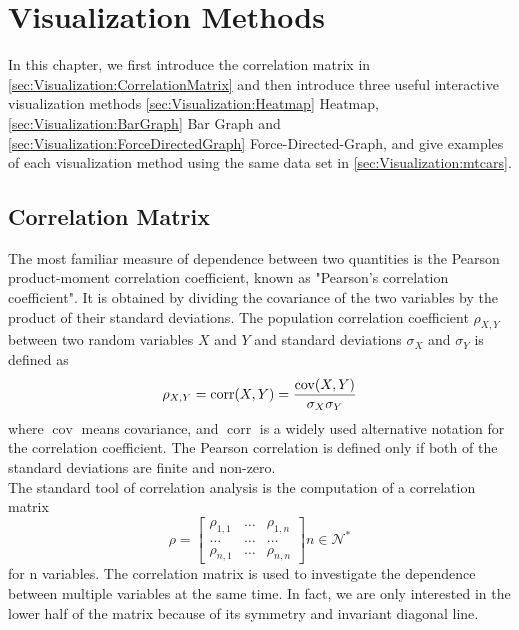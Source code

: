 
\chapter{Visualization Methods}
\label{ch:Visualization}
In this chapter, we first introduce the correlation matrix in \autoref{sec:Visualization:CorrelationMatrix} and then introduce three useful interactive visualization methods \autoref{sec:Visualization:Heatmap} Heatmap, \autoref{sec:Visualization:BarGraph} Bar Graph and \autoref{sec:Visualization:ForceDirectedGraph} Force-Directed-Graph, and give examples of each visualization method using the same data set in \autoref{sec:Visualization:mtcars}.\\

\section{Correlation Matrix}
\label{sec:Visualization:CorrelationMatrix}
The most familiar measure of dependence between two quantities is the Pearson product-moment correlation coefficient\cite{correlation}, known as "Pearson's correlation coefficient". It is obtained by dividing the covariance of the two variables by the product of their standard deviations. The population correlation coefficient $\rho _{X,Y}$ between two random variables $X$ and $Y$ and standard deviations $\sigma _{X}$ and $\sigma_Y$ is defined as
\begin{equation}
\rho _{X,Y}=\operatorname {corr} (X,Y)={\operatorname {cov} (X,Y) \over \sigma _{X}\sigma _{Y}}
\end{equation}
where $\operatorname {cov}$ means covariance, and $\operatorname {corr}$ is a widely used alternative notation for the correlation coefficient. The Pearson correlation is defined only if both of the standard deviations are finite and non-zero.\\
The standard tool of correlation analysis is the computation of a correlation matrix
\begin{equation}
\rho = \begin{bmatrix}
	\rho_{1,1} & \dots & \rho_{1,n} \\ 
	\dots & \dots & \dots \\ 
	\rho_{n,1} & \dots & \rho_{n,n}
\end{bmatrix}
n \in \mathcal{N}^*
\end{equation}
for n variables. The correlation matrix is used to investigate the dependence between multiple variables at the same time. In fact, we are only interested in the lower half of the matrix because of its symmetry and invariant diagonal line.\\

